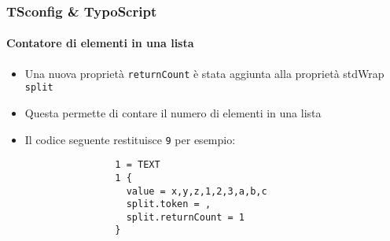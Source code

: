 
\begin{frame}[fragile]
	\frametitle{TSconfig \& TypoScript}
	\framesubtitle{Contatore di elementi in una lista}

	\lstset{basicstyle=\tiny\ttfamily}

	\begin{itemize}

		\item Una nuova proprietà \texttt{returnCount} è stata aggiunta alla proprietà stdWrap \texttt{split}

		\item Questa permette di contare il numero di elementi in una lista

		\item Il codice seguente restituisce \texttt{9} per esempio:

			\begin{lstlisting}
				1 = TEXT
				1 {
				  value = x,y,z,1,2,3,a,b,c
				  split.token = ,
				  split.returnCount = 1
				}
			\end{lstlisting}

	\end{itemize}

\end{frame}


